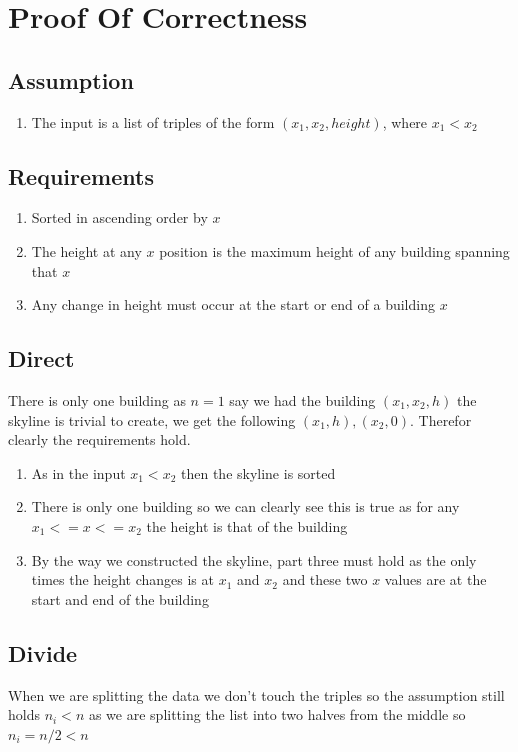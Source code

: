 \documentclass{article}
\begin{document}
		\break
		
	\section{Proof Of Correctness}

		\subsection{Assumption}
			\begin{enumerate}
				\item The input is a list of triples of the form $(x_1, x_2, height)$, where $x_1 < x_2$
			\end{enumerate}
		
		\subsection{Requirements}
			\begin{enumerate}
				\item Sorted in ascending order by $x$
				\item The height at any $x$ position is the maximum height of any building spanning that $x$
				\item Any change in height must occur at the start or end of a building $x$ 
			\end{enumerate}
		
		\subsection{Direct}
			There is only one building as $n = 1$ say we had the building $(x_1, x_2, h)$ the skyline is trivial to create, we get the following ${(x_1, h), (x_2, 0)}$. Therefor clearly the requirements hold.
			
			\begin{enumerate}
				\item As in the input $x_1 < x_2$ then the skyline is sorted
				\item There is only one building so we can clearly see this is true as for any $x_1 <= x <= x_2$ the height is that of the building
				\item By the way we constructed the skyline, part three must hold as the only times the height changes is at $x_1$ and $x_2$ and these two $x$ values are at the start and end of the building
			\end{enumerate}
			
		\subsection{Divide}
			When we are splitting the data we don't touch the triples so the assumption still holds\newline
			$n_i < n$ as we are splitting the list into two halves from the middle so $n_i = n/2 < n$\newline
			
\end{document}
